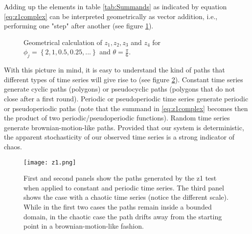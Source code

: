 Adding up the elements in table \ref{tab:Summands} as indicated by equation \ref{eq:z1complex} can be interpreted geometrically as vector addition, i.e., performing one "step" after another (see figure \ref{fig:Sum}).

\begin{figure}[H]
\begin{center}
\end{center}
\caption{\label{fig:Sum} Geometrical calculation of $z_1, z_2, z_3$ and  $z_4$ for $\phi_j = \left\lbrace 2, 1, 0.5, 0.25, ...\right\rbrace$ and $\theta = \frac{\pi}{6}$.}
\end{figure}

With this picture in mind, it is easy to understand the kind of paths that different types of time series will give rise to (see figure \ref{fig:z1Path}). Constant time series generate cyclic paths (polygons) or pseudocyclic paths (polygons that do not close after a first round). Periodic or pseudoperiodic time series generate periodic or pseudoperiodic paths (note that the summand in \ref{eq:z1complex} becomes then the product of two periodic/pseudoperiodic functions). Random time series generate brownian-motion-like paths. Provided that our system is deterministic, the apparent stochasticity of our observed time series is a strong indicator of chaos.

\begin{figure}
	\begin{center}
		\texttt{[image: z1.png]}
	\end{center}
	\caption{First and second panels show the paths generated by the z1 test when applied to constant and periodic time series. The third panel shows the case with a chaotic time series (notice the different scale). While in the first two cases the paths remain inside a bounded domain, in the chaotic case the path drifts away from the starting point in a brownian-motion-like fashion.}
	\label{fig:z1Path}
\end{figure}

